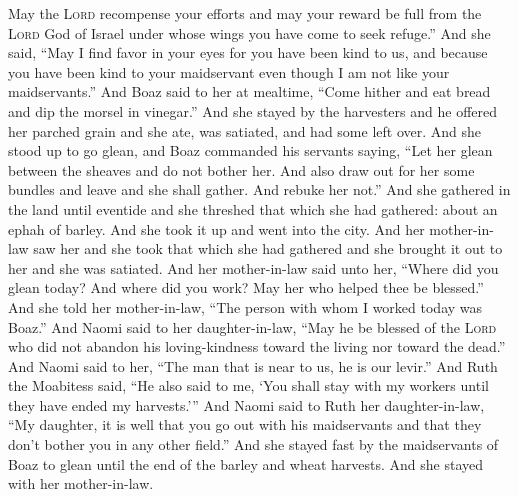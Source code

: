 \begin{inparaenum}
     May the \textsc{Lord} recompense your efforts and may your reward be full from the \textsc{Lord} God of Israel under whose wings you have come to seek refuge.''%
     And she said, ``May I find favor in your eyes for you have been kind to us, and because you have been kind to your maidservant even though I am not like your maidservants.''%
     And Boaz said to her at mealtime, ``Come hither and eat bread and dip the morsel in vinegar.'' And she stayed by the harvesters and he offered her parched grain and she ate, was satiated, and had some left over.%
     And she stood up to go glean, and Boaz commanded his servants saying, ``Let her glean between the sheaves and do not bother her.%
     And also draw out for her some bundles and leave and she shall gather. And rebuke her not.''%
     And she gathered in the land until eventide and she threshed that which she had gathered: about an ephah of barley.%
     And she took it up and went into the city. And her mother-in-law saw her and she took that which she had gathered and she brought it out to her and she was satiated.%
     And her mother-in-law said unto her, ``Where did you glean today? And where did you work? May her who helped thee be blessed.'' And she told her mother-in-law, ``The person with whom I worked today was Boaz.''%
     And Naomi said to her daughter-in-law, ``May he be blessed of the \textsc{Lord} who did not abandon his loving-kindness toward the living nor toward the dead.'' And Naomi said to her, ``The man that is near to us, he is our levir.''%
     And Ruth the Moabitess said, ``He also said to me, `You shall stay with my workers until they have ended my harvests.'''%
     And Naomi said to Ruth her daughter-in-law, ``My daughter, it is well that you go out with his maidservants and that they don't bother you in any other field.''%
     And she stayed fast by the maidservants of Boaz to glean until the end of the barley and wheat harvests. And she stayed with her mother-in-law.%
\end{inparaenum}
